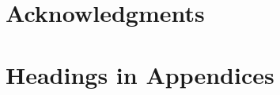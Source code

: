 \documentclass{sig-alternate-05-2015}
\begin{document}
\section{Acknowledgments}

%

%
%
\appendix
\section{Headings in Appendices}

\end{document}
